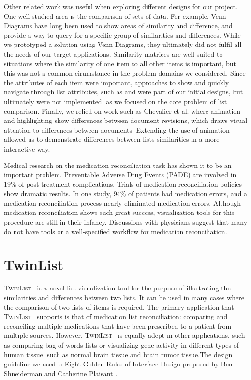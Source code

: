 \documentclass{chi2009}
\newcommand{\TwinList}{\textsc{TwinList}}
\begin{document}
Other related work was useful when exploring different designs for our project. One well-studied area is the comparison of sets of data. For example, Venn Diagrams have long been used to show areas of similarity and difference, and provide a way to query for a specific group of similarities and differences\cite{kestler2005generalized}. While we prototyped a solution using Venn Diagrams, they ultimately did not fulfil all the needs of our target applications. Similarity matrices \cite{TODO} are well-suited to situations where the similarity of one item to all other items is important, but this was not a common cirumstance in the problem domains we considered. Since the attributes of each item were important, approaches to show and quickly navigate through list attributes, such as \cite{Chimera:1992:VBI:142750.142817} and \cite{Masui98lensbar} were part of our initial designs, but ultimately were not implemented, as we focused on the core problem of list comparison. Finally, we relied on work such as Chevalier et al. \cite{diffmation10} where animation and highlighting show differences between document revisions, which draws visual attention to differences between documents. Extending the use of animation allowed us to demonstrate differences between lists similarities in a more interactive way.

Medical research on the medication reconciliation task has shown it to be an important problem\cite{icutool03}. Preventable Adverse Drug Events (PADE) are involved in 19\% of post-treatment complications. Trials of medication reconciliation policies show dramatic results. In one study, 94\% of patients had medication errors, and a medication reconciliation process nearly eliminated medication errors\cite{icutool03}. Although medication reconciliation shows such great success, visualization tools for this procedure are still in their infancy. Discussions with physicians suggest that many do not have tools or a well-specified workflow for medication reconciliation. 

\section{TwinList}
\TwinList~ is a novel list visualization tool for the purpose of illustrating the similarities and differences between two lists. It can be used in many cases where the comparison of two lists of items is required. The primary application that \TwinList~ supports is that of medication list reconciliation: comparing and reconciling multiple medications that have been prescribed to a patient from multiple sources\cite{JCAHO-2006}. However, \TwinList~ is equally adept in other applications, such as comparing bag-of-words lists or visualizing gene activity in different types of human tissue, such as normal brain tissue and brain tumor tissue.The design guideline we used is Eight Golden Rules of Interface Design  proposed by Ben Shneiderman and Catherine Plaisant \cite{shneiderman}.
\end{document}
